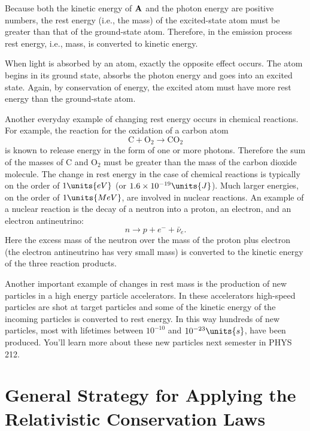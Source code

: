 Because both the kinetic energy of ${\bf A}$ and the photon energy are
positive numbers, the rest energy (i.e., the mass) of the
excited-state atom must be greater than that of the ground-state atom.
Therefore, in the emission process rest energy, i.e., mass, is
converted to kinetic energy.
     
When light is absorbed by an atom, exactly the opposite effect occurs.
The atom begins in its ground state, absorbs the photon energy and
goes into an excited state.  Again, by conservation of energy, the
excited atom must have more rest energy than the ground-state atom.

Another everyday example of changing rest energy occurs in chemical
reactions.  For example, the reaction for the oxidation of a carbon
atom
\begin{equation}
\text{C} + \text{O}_2 \rightarrow \text{CO}_2
\end{equation}
is known to release energy in the form of one or more photons.
Therefore the sum of the masses of C and O$_2$ must be greater than
the mass of the carbon dioxide molecule.  The change in rest energy in
the case of chemical reactions is typically on the order of
$1\units{eV}$ (or $1.6\times 10^{-19}\units{J}$).  Much larger
energies, on the order of $1\units{MeV}$, are involved in nuclear
reactions.  An example of a nuclear reaction is the decay of a neutron
into a proton, an electron, and an electron antineutrino:
\begin{equation}
n \rightarrow p + e^- + \bar{\nu}_e.
\end{equation}
Here the excess mass of the neutron over the mass of the proton plus
electron (the electron antineutrino has very small mass) is converted
to the kinetic energy of the three reaction products.

Another important example of changes in rest mass is the production of
new particles in a high energy particle accelerators.  In these
accelerators high-speed particles are shot at target particles and
some of the kinetic energy of the incoming particles is converted to
rest energy.  In this way hundreds of new particles, most with
lifetimes between $10^{-10}$ and $10^{-23}\units{s}$, have been
produced.  You'll learn more about these new particles next semester
in PHYS 212.

\section[General Strategy]{General Strategy for 
Applying the Relativistic Conservation Laws}


